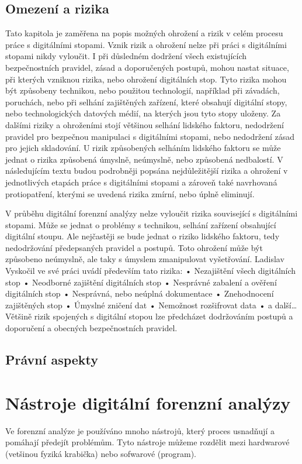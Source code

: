 \documentclass[thesis=B,czech]{FITthesis}[2012/06/26]
\begin{document}
\section{Omezení a rizika}
\cite{for_wi}

Tato kapitola je zaměřena na popis možných ohrožení a rizik v celém procesu práce
s digitálními stopami. Vznik rizik a ohrožení nelze při práci s digitálními stopami nikdy
vyloučit. I při důsledném dodržení všech existujících bezpečnostních pravidel, zásad
a doporučených postupů, mohou nastat situace, při kterých vzniknou rizika, nebo ohrožení
digitálních stop. Tyto rizika mohou být způsobeny technikou, nebo použitou technologií,
například při závadách, poruchách, nebo při selhání zajištěných zařízení, které obsahují
digitální stopy, nebo technologických datových médií, na kterých jsou tyto stopy uloženy.
Za dalšími riziky a ohroženími stojí většinou selhání lidského faktoru, nedodržení pravidel
pro bezpečnou manipulaci s digitálními stopami, nebo nedodržení zásad pro jejich
skladování. U rizik způsobených selháním lidského faktoru se může jednat o rizika
způsobená úmyslně, neúmyslně, nebo způsobená nedbalostí. V následujícím textu budou
podrobněji popsána nejdůležitější rizika a ohrožení v jednotlivých etapách práce
s digitálními stopami a zároveň také navrhovaná protiopatření, kterými se uvedená rizika
zmírní, nebo úplně eliminují.
\cite{for_baka}

V průběhu digitální forenzní analýzy nelze vyloučit rizika související s digitálními stopami.
Může se jednat o problémy s technikou, selhání zařízení obsahující digitální stoupu. Ale
nejčastěji se bude jednat o riziko lidského faktoru, tedy nedodržování předepsaných pravidel
a postupů. Toto ohrožení může být způsobeno neúmyslně, ale taky s úmyslem zmanipulovat
vyšetřování. Ladislav Vyskočil ve své práci uvádí především tato rizika:
• Nezajištění všech digitálních stop
• Neodborné zajištění digitálních stop
• Nesprávné zabalení a ověření digitálních stop
• Nesprávná, nebo neúplná dokumentace
• Znehodnocení zajištěných stop
• Úmyslné zničení dat
• Nemožnost rozšifrovat data
• a další…
Většině rizik spojených s digitální stopou lze předcházet dodržováním postupů a doporučení
a obecných bezpečnostních pravidel.

\section{Právní aspekty}
\cite{svetlik2010digitalni}

\chapter{Nástroje digitální forenzní analýzy} 
\label{body}
Ve forenzní analýze je používáno mnoho nástrojů, který proces usnadňují a pomáhají předejít problémům. Tyto nástroje můžeme rozdělit mezi hardwarové (vetšinou fyziká krabička) nebo sofwarové (program).
\end{document}
